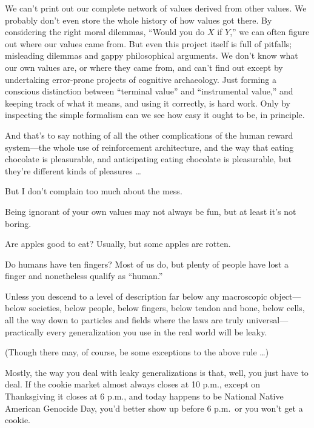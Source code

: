 {
 We can't print out our complete network of values
derived from other values. We probably don't even store
the whole history of how values got there. By considering the right
moral dilemmas, ``Would you do $X$ if
$Y$,'' we can often figure out where our values came
from. But even this project itself is full of pitfalls; misleading
dilemmas and gappy philosophical arguments. We don't
know what our own values are, or where they came from, and
can't find out except by undertaking error-prone
projects of cognitive archaeology. Just forming a conscious distinction
between ``terminal value'' and
``instrumental value,'' and keeping
track of what it means, and using it correctly, is hard work. Only by
inspecting the simple formalism can we see how easy it ought to be, in
principle.}

{
 And that's to say nothing of all the other
complications of the human reward system---the whole use of
reinforcement architecture, and the way that eating chocolate is
pleasurable, and anticipating eating chocolate is pleasurable, but
they're different kinds of pleasures \ldots}

{
 But I don't complain too much about the mess.}

{
 Being ignorant of your own values may not always be fun, but at
least it's not boring.}

\myendsectiontext


{
 Are apples good to eat? Usually, but some apples are rotten. }

{
 Do humans have ten fingers? Most of us do, but plenty of people
have lost a finger and nonetheless qualify as
``human.''}

{
 Unless you descend to a level of description far below any
macroscopic object---below societies, below people, below fingers,
below tendon and bone, below cells, all the way down to particles and
fields where the laws are truly universal---practically every
generalization you use in the real world will be leaky.}

{
 (Though there may, of course, be some exceptions to the above rule
\ldots)}

{
 Mostly, the way you deal with leaky generalizations is that, well,
you just have to deal. If the cookie market almost always closes at 10
p.m., except on Thanksgiving it closes at 6 p.m., and today happens to
be National Native American Genocide Day, you'd better
show up before 6 p.m.~or you won't get a cookie.}

